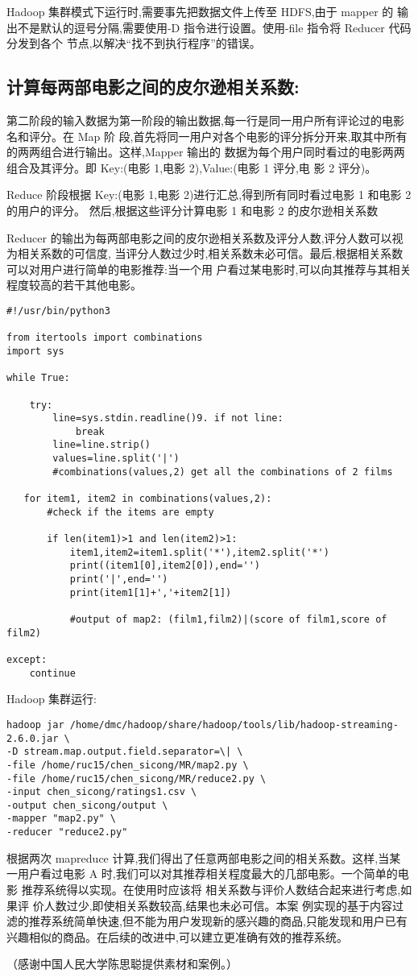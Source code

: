 Hadoop 集群模式下运行时,需要事先把数据文件上传至 HDFS,由于 mapper 的 输
出不是默认的逗号分隔,需要使用-D 指令进行设置。使用-file 指令将 Reducer
代码 分发到各个 节点,以解决``找不到执行程序''的错误。

\subsection{计算每两部电影之间的皮尔逊相关系数:}\label{ux8ba1ux7b97ux6bcfux4e24ux90e8ux7535ux5f71ux4e4bux95f4ux7684ux76aeux5c14ux900aux76f8ux5173ux7cfbux6570}

第二阶段的输入数据为第一阶段的输出数据,每一行是同一用户所有评论过的电影名和评分。在
Map 阶
段,首先将同一用户对各个电影的评分拆分开来,取其中所有的两两组合进行输出。这样,Mapper
输出的 数据为每个用户同时看过的电影两两组合及其评分。即 Key:(电影 1,电影
2),Value:(电影 1 评分,电 影 2 评分)。

Reduce 阶段根据 Key:(电影 1,电影 2)进行汇总,得到所有同时看过电影 1
和电影 2 的用户的评分。 然后,根据这些评分计算电影 1 和电影 2
的皮尔逊相关系数

Reducer
的输出为每两部电影之间的皮尔逊相关系数及评分人数,评分人数可以视为相关系数的可信度,
当评分人数过少时,相关系数未必可信。最后,根据相关系数可以对用户进行简单的电影推荐:当一个用
户看过某电影时,可以向其推荐与其相关程度较高的若干其他电影。

\begin{lstlisting}
#!/usr/bin/python3

from itertools import combinations
import sys

while True:

    try:
        line=sys.stdin.readline()9. if not line:
            break
        line=line.strip()
        values=line.split('|')
        #combinations(values,2) get all the combinations of 2 films

   for item1, item2 in combinations(values,2):
       #check if the items are empty

       if len(item1)>1 and len(item2)>1:
           item1,item2=item1.split('*'),item2.split('*')
           print((item1[0],item2[0]),end='')
           print('|',end='')
           print(item1[1]+','+item2[1])

           #output of map2: (film1,film2)|(score of film1,score of film2)

except:
    continue
\end{lstlisting}

Hadoop 集群运行:

\begin{lstlisting}
hadoop jar /home/dmc/hadoop/share/hadoop/tools/lib/hadoop-streaming-2.6.0.jar \
-D stream.map.output.field.separator=\| \
-file /home/ruc15/chen_sicong/MR/map2.py \
-file /home/ruc15/chen_sicong/MR/reduce2.py \
-input chen_sicong/ratings1.csv \
-output chen_sicong/output \
-mapper "map2.py" \
-reducer "reduce2.py"
\end{lstlisting}

根据两次 mapreduce 计算,我们得出了任意两部电影之间的相关系数。这样,当某
一用户看过电影 A
时,我们可以对其推荐相关程度最大的几部电影。一个简单的电影
推荐系统得以实现。在使用时应该将
相关系数与评价人数结合起来进行考虑,如果评
价人数过少,即使相关系数较高,结果也未必可信。本案
例实现的基于内容过滤的推荐系统简单快速,但不能为用户发现新的感兴趣的商品,只能发现和用户已有
兴趣相似的商品。在后续的改进中,可以建立更准确有效的推荐系统。

（感谢中国人民大学陈思聪提供素材和案例。）
